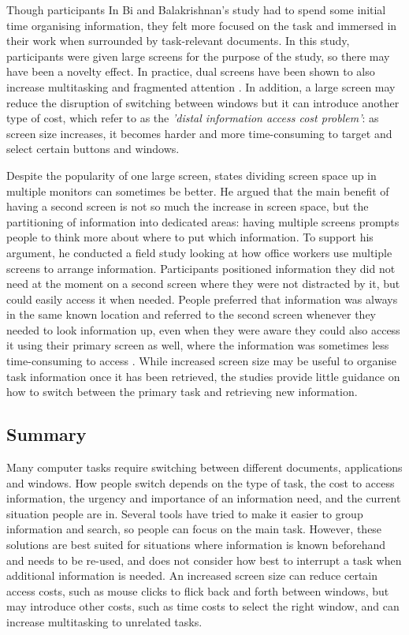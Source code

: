 Though participants In Bi and Balakrishnan's study had to spend some initial time organising information, they felt more focused on the task and immersed in their work when surrounded by task-relevant documents. In this study, participants were given large screens for the purpose of the study, so there may have been a novelty effect. In practice, dual screens have been shown to also increase multitasking and fragmented attention \citep{Robertson2005}. In addition, a large screen may reduce the disruption of switching between windows but it can introduce another type of cost, which \citet{Robertson2005} refer to as the \textit{'distal information access cost problem'}: as screen size increases, it becomes harder and more time-consuming to target and select certain buttons and windows. 

Despite the popularity of one large screen, \citet{Grudin2001} states dividing screen space up in multiple monitors can sometimes be better. He argued that the main benefit of having a second screen is not so much the increase in screen space, but the partitioning of information into dedicated areas: having multiple screens prompts people to think more about where to put which information. To support his argument, he conducted a field study looking at how office workers use multiple screens to arrange information. Participants positioned information they did not need at the moment on a second screen where they were not distracted by it, but could easily access it when needed. People preferred that information was always in the same known location and referred to the second screen whenever they needed to look information up, even when they were aware they could also access it using their primary screen as well, where the information was sometimes less time-consuming to access \citep{Grudin2001}. While increased screen size may be useful to organise task information once it has been retrieved, the studies provide little guidance on how to switch between the primary task and retrieving new information. 

\subsection{Summary}
Many computer tasks require switching between different documents, applications and windows. How people switch depends on the type of task, the cost to access information, the urgency and importance of an information need, and the current situation people are in. Several tools have tried to make it easier to group information and search, so people can focus on the main task. However, these solutions are best suited for situations where information is known beforehand and needs to be re-used, and does not consider how best to interrupt a task when additional information is needed. An increased screen size can reduce certain access costs, such as mouse clicks to flick back and forth between windows, but may introduce other  costs, such as time costs to select the right window, and can increase multitasking to unrelated tasks.

